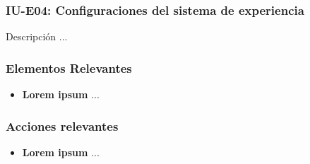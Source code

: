 
\subsubsection{IU-E04: Configuraciones del sistema de experiencia}

 Descripción ...


\subsubsection{Elementos Relevantes}

    \begin{itemize}
    \item {\bf Lorem ipsum}
        ...
    \end{itemize}

\subsubsection{Acciones relevantes}

    \begin{itemize}
    \item {\bf Lorem ipsum}
        ...
    \end{itemize}

\clearpage
